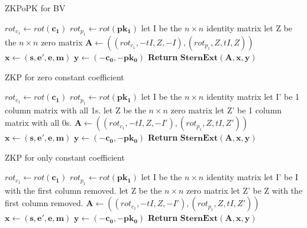 \begin{algorithm}
	\caption{ZKPoPK for BV}\label{alg:ZKPBV}
	\begin{algorithmic}[1]
		\State $rot_{c_1} \gets rot(\mathbf{c_1})$
		\State $rot_{p_1} \gets rot(\mathbf{pk_1})$
		\State let I be the $n \times n$ identity matrix
		\State let Z be the $n \times n $ zero matrix
		\State $\mathbf{A} \gets ((rot_{c_1},-tI, Z, -I),(rot_{p_1}, Z, tI,Z)) $
		\State $\mathbf{x} \gets (\mathbf{s, e', e, m})$
		\State $\mathbf{y} \gets (\mathbf{-c_0, -pk_0})$
		\State \textbf{Return} $\mathbf{SternExt(A,x,y)}$
		\EndProcedure
	\end{algorithmic}
\end{algorithm}

	\begin{algorithm}
	\caption{ZKP for zero constant coefficient}\label{alg:ZKPExt1}
	\begin{algorithmic}[1]
		\State $rot_{c_1} \gets rot(\mathbf{c_1})$
		\State $rot_{p_1} \gets rot(\mathbf{pk_1})$
		\State let I be the $n \times n$ identity matrix
		\State let I' be 1 column matrix with all 1s.
		\State let Z be the $n \times n $ zero matrix
		\State let Z' be 1 column matrix with all 0s.
		\State $\mathbf{A} \gets ((rot_{c_1},-tI, Z, -I'),(rot_{p_1}, Z, tI,Z')) $
		\State $\mathbf{x} \gets (\mathbf{s, e', e, m})$
		\State $\mathbf{y} \gets (\mathbf{-c_0, -pk_0})$
		\State \textbf{Return} $\mathbf{SternExt(A,x,y)}$
		\EndProcedure
	\end{algorithmic}
\end{algorithm}

	\begin{algorithm}
		\caption{ZKP for only constant coefficient}\label{alg:ZKPExt2}
		\begin{algorithmic}[1]
			\State $rot_{c_1} \gets rot(\mathbf{c_1})$
			\State $rot_{p_1} \gets rot(\mathbf{pk_1})$
			\State let I be the $n \times n$ identity matrix
			\State let I' be I with the first column removed.
			\State let Z be the $n \times n $ zero matrix
			\State let Z' be Z with the first column removed.
			\State $\mathbf{A} \gets ((rot_{c_1},-tI, Z, -I'),(rot_{p_1}, Z, tI,Z')) $
			\State $\mathbf{x} \gets (\mathbf{s, e', e, m})$
			\State $\mathbf{y} \gets (\mathbf{-c_0, -pk_0})$
			\State \textbf{Return} $\mathbf{SternExt(A,x,y)}$
			\EndProcedure
		\end{algorithmic}
	\end{algorithm}

